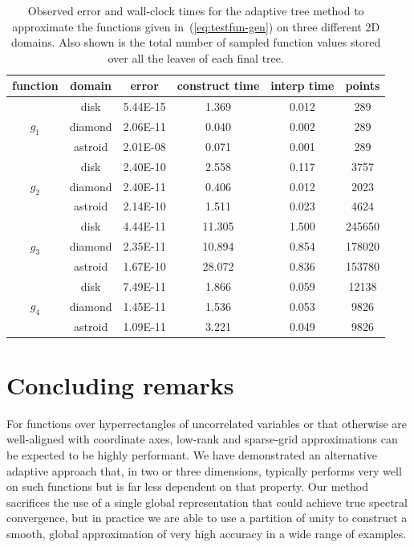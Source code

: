 \begin{table}
\begin{tabular}{c|c|c|c|c|c}
function & domain & error & construct time & interp time & points \\ [5pt] \hline
\multirow{3}{*}{ $g_1$ } & disk & 5.44E-15 & 1.369 & 0.012 & 289 \\
& diamond & 2.06E-11 & 0.040 & 0.002 & 289 \\
& astroid & 2.01E-08 & 0.071 & 0.001 & 289 \\ \hline
\multirow{3}{*}{ $g_2$ } & disk & 2.40E-10 & 2.558 & 0.117 & 3757 \\
& diamond & 2.40E-11 & 0.406 & 0.012 & 2023 \\
& astroid & 2.14E-10 & 1.511 & 0.023 & 4624 \\ \hline
\multirow{3}{*}{ $g_3$ } & disk & 4.44E-11 & 11.305 & 1.500 & 245650 \\
& diamond & 2.35E-11 & 10.894 & 0.854 & 178020 \\
& astroid & 1.67E-10 & 28.072 & 0.836 & 153780 \\ \hline
\multirow{3}{*}{ $g_4$ } & disk & 7.49E-11 & 1.866 & 0.059 & 12138 \\
& diamond & 1.45E-11 & 1.536 & 0.053 & 9826 \\
& astroid & 1.09E-11 & 3.221 & 0.049 & 9826 \\
\end{tabular}
  \caption{Observed error and wall-clock times for the adaptive tree method to approximate the functions given in~(\ref{eq:testfun-gen}) on three different 2D domains. Also shown is the total number of sampled function values stored over all the leaves of each final tree.}
  \label{table_general}
\end{table}


\section{Concluding remarks}
\label{sec:conclusion}

For functions over hyperrectangles of uncorrelated variables or that otherwise are well-aligned with coordinate axes, low-rank and sparse-grid approximations can be expected to be highly performant. We have demonstrated an alternative adaptive approach that, in two or three dimensions, typically performs very well on such functions but is far less dependent on that property. Our method sacrifices the use of a single global representation that could achieve true spectral convergence, but in practice we are able to use a partition of unity to construct a smooth, global approximation of very high accuracy in a wide range of examples. 

